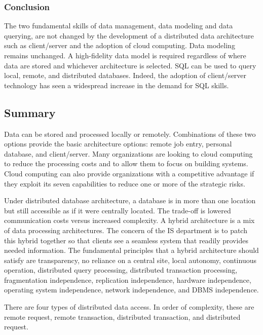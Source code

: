 \documentclass[
]{article}
\begin{document}
\hypertarget{conclusion-4}{%
\subsubsection*{Conclusion}\label{conclusion-4}}

The two fundamental skills of data management, data modeling and data
querying, are not changed by the development of a distributed data
architecture such as client/server and the adoption of cloud computing.
Data modeling remains unchanged. A high-fidelity data model is required
regardless of where data are stored and whichever architecture is
selected. SQL can be used to query local, remote, and distributed
databases. Indeed, the adoption of client/server technology has seen a
widespread increase in the demand for SQL skills.

\hypertarget{summary-13}{%
\subsection*{Summary}\label{summary-13}}

Data can be stored and processed locally or remotely. Combinations of
these two options provide the basic architecture options: remote job
entry, personal database, and client/server. Many organizations are
looking to cloud computing to reduce the processing costs and to allow
them to focus on building systems. Cloud computing can also provide
organizations with a competitive advantage if they exploit its seven
capabilities to reduce one or more of the strategic risks.

Under distributed database architecture, a database is in more than one
location but still accessible as if it were centrally located. The
trade-off is lowered communication costs versus increased complexity. A
hybrid architecture is a mix of data processing architectures. The
concern of the IS department is to patch this hybrid together so that
clients see a seamless system that readily provides needed information.
The fundamental principles that a hybrid architecture should satisfy are
transparency, no reliance on a central site, local autonomy, continuous
operation, distributed query processing, distributed transaction
processing, fragmentation independence, replication independence,
hardware independence, operating system independence, network
independence, and DBMS independence.

There are four types of distributed data access. In order of complexity,
these are remote request, remote transaction, distributed transaction,
and distributed request.
\end{document}
